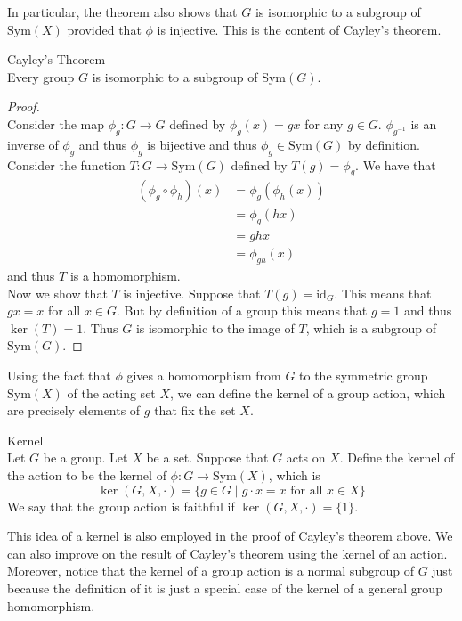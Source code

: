 \documentclass[a4paper]{article}
\begin{document}
In particular, the theorem also shows that $G$ is isomorphic to a subgroup of $\text{Sym}(X)$ provided that $\phi$ is injective. This is the content of Cayley's theorem. 

\begin{thm}{Cayley's Theorem}{}\\
Every group $G$ is isomorphic to a subgroup of $\text{Sym}(G)$. 
\begin{proof}\\
Consider the map $\phi_g:G\to G$ defined by $\phi_g(x)=gx$ for any $g\in G$. $\phi_{g^{-1}}$ is an inverse of $\phi_g$ and thus $\phi_g$ is bijective and thus $\phi_g\in\text{Sym}(G)$ by definition. \\
Consider the function $T:G\to\text{Sym}(G)$ defined by $T(g)=\phi_g$. We have that 
\begin{align*}
(\phi_g\circ\phi_h)(x)&=\phi_g(\phi_h(x))\\
&=\phi_g(hx)\\
&=ghx\\
&=\phi_{gh}(x)
\end{align*}
and thus $T$ is a homomorphism. \\
Now we show that $T$ is injective. Suppose that $T(g)=\text{id}_G$. This means that $gx=x$ for all $x\in G$. But by definition of a group this means that $g=1$ and thus $\ker(T)=1$. Thus $G$ is isomorphic to the image of $T$, which is a subgroup of $\text{Sym}(G)$. 
\end{proof}
\end{thm}

Using the fact that $\phi$ gives a homomorphism from $G$ to the symmetric group $\text{Sym}(X)$ of the acting set $X$, we can define the kernel of a group action, which are precisely elements of $g$ that fix the set $X$. 

\begin{defn}{Kernel}{}\\
Let $G$ be a group. Let $X$ be a set. Suppose that $G$ acts on $X$. Define the kernel of the action to be the kernel of $\phi:G\to\text{Sym}(X)$, which is $$\ker(G,X,\cdot)=\{g\in G\;|\;g\cdot x=x\text{ for all }x\in X\}$$ We say that the group action is faithful if $\ker(G,X,\cdot)=\{1\}$. 
\end{defn}

This idea of a kernel is also employed in the proof of Cayley's theorem above. We can also improve on the result of Cayley's theorem using the kernel of an action. Moreover, notice that the kernel of a group action is a normal subgroup of $G$ just because the definition of it is just a special case of the kernel of a general group homomorphism. 
\end{document}
